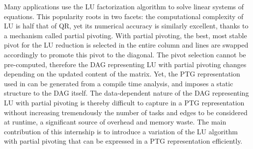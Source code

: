 
Many applications use the LU factorization algorithm to solve
linear systems of equations. This popularity roots in two facets: the
computational complexity of LU is half that of QR, yet its numerical
accuracy is similarly excellent, thanks to a mechanism called partial
pivoting. With partial pivoting, the best, most stable pivot for the LU
reduction is selected in the entire column and lines are swapped
accordingly to promote this pivot to the diagonal. The pivot
selection cannot be pre-computed, therefore
the DAG representing LU with partial pivoting changes depending on the
updated content of the matrix. Yet, the PTG representation used in
\dague can be generated from a compile time analysis, and imposes a static
structure to the DAG itself. The data-dependent nature of the DAG
representing LU with partial pivoting is thereby difficult to capture in
a PTG representation without increasing tremendously the number of tasks
and edges to be considered at runtime, a significant source of overhead
and memory waste. The main contribution of this internship is to introduce a
variation of the LU algorithm with partial pivoting that can be
expressed in a PTG representation efficiently.



